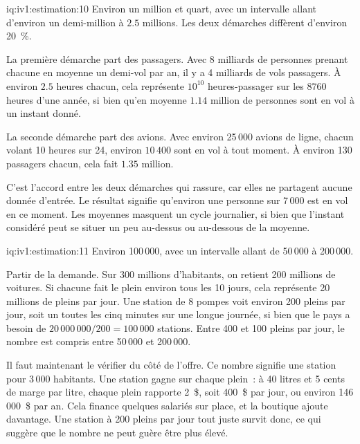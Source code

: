 \begin{solution}{iq:iv1:estimation:10}
Environ un million et quart, avec un intervalle allant d'environ un demi-million à $2.5$ millions. Les deux démarches diffèrent d'environ 20~\%.

La première démarche part des passagers. Avec 8 milliards de personnes prenant chacune en moyenne un demi-vol par an, il y a 4 milliards de vols passagers. À environ $2.5$ heures chacun, cela représente $10^{10}$ heures-passager sur les $8760$ heures d'une année, si bien qu'en moyenne $1.14$ million de personnes sont en vol à un instant donné.

La seconde démarche part des avions. Avec environ 25\,000 avions de ligne, chacun volant 10 heures sur 24, environ $10\,400$ sont en vol à tout moment. À environ 130 passagers chacun, cela fait $1.35$ million.

C'est l'accord entre les deux démarches qui rassure, car elles ne partagent aucune donnée d'entrée. Le résultat signifie qu'environ une personne sur 7\,000 est en vol en ce moment. Les moyennes masquent un cycle journalier, si bien que l'instant considéré peut se situer un peu au-dessus ou au-dessous de la moyenne.

\end{solution}

\begin{solution}{iq:iv1:estimation:11}
Environ 100\,000, avec un intervalle allant de 50\,000 à 200\,000.

Partir de la demande. Sur 300 millions d'habitants, on retient 200 millions de voitures. Si chacune fait le plein environ tous les 10 jours, cela représente 20 millions de pleins par jour. Une station de 8 pompes voit environ 200 pleins par jour, soit un toutes les cinq minutes sur une longue journée, si bien que le pays a besoin de $20\,000\,000/200 = 100\,000$ stations. Entre 400 et 100 pleins par jour, le nombre est compris entre 50\,000 et 200\,000.

Il faut maintenant le vérifier du côté de l'offre. Ce nombre signifie une station pour 3\,000 habitants. Une station gagne sur chaque plein~: à 40 litres et 5 cents de marge par litre, chaque plein rapporte 2~\$, soit 400~\$ par jour, ou environ 146\,000~\$ par an. Cela finance quelques salariés sur place, et la boutique ajoute davantage. Une station à 200 pleins par jour tout juste survit donc, ce qui suggère que le nombre ne peut guère être plus élevé.

\end{solution}


